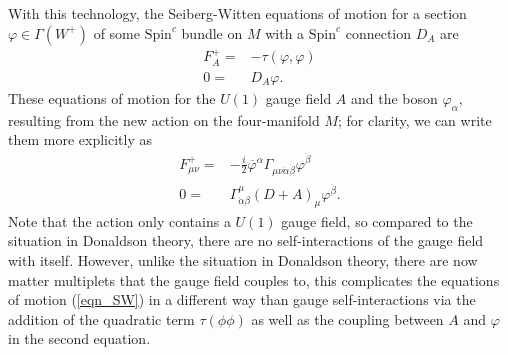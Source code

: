 \documentclass[12pt, onecolumn]{article}
\begin{document}
\noindent With this technology, the Seiberg-Witten equations of motion for a section $\varphi \in \Gamma(W^{+})$ of some $\text{Spin}^{c}$ bundle on $M$ with a $\text{Spin}^{c}$ connection $D_{A}$ are
\begin{align*}
F^{+}_{A}=&-\tau(\varphi,\varphi)\\
0=&D_{A}\varphi.
\end{align*}
These equations of motion for the $U(1)$ gauge field $A$ and the boson $\varphi_{\alpha}$, resulting from the new action on the four-manifold $M$; for clarity, we can write them more explicitly as
\begin{align}
F_{\mu \nu}^{+}=&-\frac{i}{2} \overline{\varphi}^{\dot{\alpha}}\Gamma_{\mu \nu \dot{\alpha} \dot{\beta}}\varphi^{\dot{\beta}} \nonumber \\
0=&\Gamma^{\mu}_{\dot{\alpha} \beta}(D+A)_{\mu}\varphi^{\dot{\beta}}.
\label{eqn_SW}
\end{align}
Note that the action only contains a $U(1)$ gauge field, so compared to the situation in Donaldson theory, there are no self-interactions of the gauge field with itself.  However, unlike the situation in Donaldson theory, there are now matter multiplets that the gauge field couples to, this complicates the equations of motion (\ref{eqn_SW}) in a different way than gauge self-interactions via the addition of the quadratic term $\tau(\phi\phi)$ as well as the coupling between $A$ and $\varphi$ in the second equation.
\end{document}
